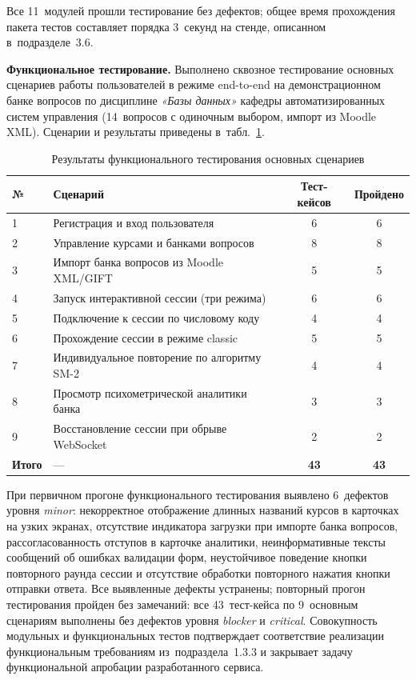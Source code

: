 Все 11~модулей прошли тестирование без дефектов; общее время
прохождения пакета тестов составляет порядка 3~секунд на стенде,
описанном в~подразделе~3.6.

\textbf{Функциональное тестирование.} Выполнено сквозное
тестирование основных сценариев работы пользователей в режиме
end-to-end на демонстрационном банке вопросов по дисциплине
\textit{«Базы данных»} кафедры автоматизированных систем
управления (14~вопросов с одиночным выбором, импорт из Moodle XML).
Сценарии и результаты приведены в~табл.~\ref{tab:functional-tests}.

\begin{table}[!htb]
\fontsize{11pt}{13pt}\selectfont
\centering
\caption{Результаты функционального тестирования основных сценариев}
\label{tab:functional-tests}
\smallskip
\begin{tabular}{|l|p{6.5cm}|c|c|}
    \hline
    \textbf{№} & \textbf{Сценарий} & \textbf{Тест-кейсов} & \textbf{Пройдено} \\
    \hline
        1 & Регистрация и вход пользователя                 & 6  & 6  \\
    \hline
        2 & Управление курсами и банками вопросов           & 8  & 8  \\
    \hline
        3 & Импорт банка вопросов из Moodle XML/GIFT        & 5  & 5  \\
    \hline
        4 & Запуск интерактивной сессии (три режима)        & 6  & 6  \\
    \hline
        5 & Подключение к сессии по числовому коду          & 4  & 4  \\
    \hline
        6 & Прохождение сессии в режиме classic             & 5  & 5  \\
    \hline
        7 & Индивидуальное повторение по алгоритму SM-2     & 4  & 4  \\
    \hline
        8 & Просмотр психометрической аналитики банка       & 3  & 3  \\
    \hline
        9 & Восстановление сессии при обрыве WebSocket      & 2  & 2  \\
    \hline
        \textbf{Итого} & --- & \textbf{43} & \textbf{43} \\
    \hline
\end{tabular}
\end{table}
\FloatBarrier

При первичном прогоне функционального тестирования выявлено
6~дефектов уровня \emph{minor}: некорректное отображение длинных
названий курсов в карточках на узких экранах, отсутствие индикатора
загрузки при импорте банка вопросов, рассогласованность отступов
в карточке аналитики, неинформативные тексты сообщений об ошибках
валидации форм, неустойчивое поведение кнопки повторного раунда
сессии и отсутствие обработки повторного нажатия кнопки отправки
ответа. Все выявленные дефекты устранены; повторный прогон
тестирования пройден без замечаний: все 43~тест-кейса
по 9~основным сценариям выполнены без дефектов уровня \emph{blocker}
и \emph{critical}.
Совокупность модульных и функциональных тестов подтверждает
соответствие реализации функциональным требованиям из~подраздела~1.3.3
и закрывает задачу функциональной апробации разработанного сервиса.

